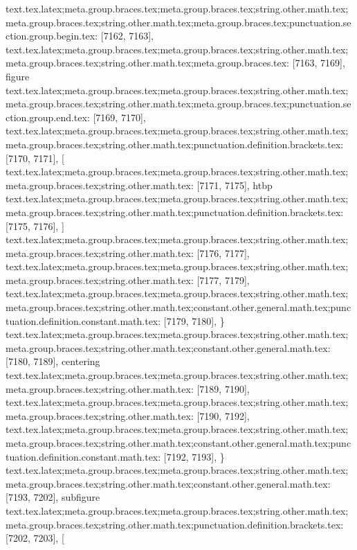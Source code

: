 {{{{{{{{{{{{{{{{{{{{{{{{{{{{{{{{{{{{{{{{{{{{{{{{{{{{{{{{{{{{{{{{{{{{{{{{{{{{{{{{{{{{{{{{{{{{{{{{{{{{{{{{{{{{{{{{{{{{{{{{{{{{{{{{{{{{{{{{{{{{{{{{{{{{{{{{{{{{{{{{{{{{{{{{{{{{{{{{{{{{{{{{{{{text.tex.latex;meta.group.braces.tex;meta.group.braces.tex;string.other.math.tex;meta.group.braces.tex;string.other.math.tex;meta.group.braces.tex;punctuation.section.group.begin.tex: [7162, 7163], {{}
text.tex.latex;meta.group.braces.tex;meta.group.braces.tex;string.other.math.tex;meta.group.braces.tex;string.other.math.tex;meta.group.braces.tex: [7163, 7169], {figure}
text.tex.latex;meta.group.braces.tex;meta.group.braces.tex;string.other.math.tex;meta.group.braces.tex;string.other.math.tex;meta.group.braces.tex;punctuation.section.group.end.tex: [7169, 7170], {}}
text.tex.latex;meta.group.braces.tex;meta.group.braces.tex;string.other.math.tex;meta.group.braces.tex;string.other.math.tex;punctuation.definition.brackets.tex: [7170, 7171], {[}
text.tex.latex;meta.group.braces.tex;meta.group.braces.tex;string.other.math.tex;meta.group.braces.tex;string.other.math.tex: [7171, 7175], {htbp}
text.tex.latex;meta.group.braces.tex;meta.group.braces.tex;string.other.math.tex;meta.group.braces.tex;string.other.math.tex;punctuation.definition.brackets.tex: [7175, 7176], {]}
text.tex.latex;meta.group.braces.tex;meta.group.braces.tex;string.other.math.tex;meta.group.braces.tex;string.other.math.tex: [7176, 7177], {
}
text.tex.latex;meta.group.braces.tex;meta.group.braces.tex;string.other.math.tex;meta.group.braces.tex;string.other.math.tex: [7177, 7179], {  }
text.tex.latex;meta.group.braces.tex;meta.group.braces.tex;string.other.math.tex;meta.group.braces.tex;string.other.math.tex;constant.other.general.math.tex;punctuation.definition.constant.math.tex: [7179, 7180], {\}
text.tex.latex;meta.group.braces.tex;meta.group.braces.tex;string.other.math.tex;meta.group.braces.tex;string.other.math.tex;constant.other.general.math.tex: [7180, 7189], {centering}
text.tex.latex;meta.group.braces.tex;meta.group.braces.tex;string.other.math.tex;meta.group.braces.tex;string.other.math.tex: [7189, 7190], {
}
text.tex.latex;meta.group.braces.tex;meta.group.braces.tex;string.other.math.tex;meta.group.braces.tex;string.other.math.tex: [7190, 7192], {  }
text.tex.latex;meta.group.braces.tex;meta.group.braces.tex;string.other.math.tex;meta.group.braces.tex;string.other.math.tex;constant.other.general.math.tex;punctuation.definition.constant.math.tex: [7192, 7193], {\}
text.tex.latex;meta.group.braces.tex;meta.group.braces.tex;string.other.math.tex;meta.group.braces.tex;string.other.math.tex;constant.other.general.math.tex: [7193, 7202], {subfigure}
text.tex.latex;meta.group.braces.tex;meta.group.braces.tex;string.other.math.tex;meta.group.braces.tex;string.other.math.tex;punctuation.definition.brackets.tex: [7202, 7203], {[}
}}}}}}}}}}}}}}}}}}}}}}}}}}}}}}}}}}}}}}}}}}}}}}}}}}}}}}}}}}}}}}}}}}}}}}}}}}}}}}}}}}}}}}}}}}}}}}}}}}}}}}}}}}}}}}}}}}}}}}}}}}}}}}}}}}}}}}}}}}}}}}}}}}}}}}}}}}}}}}}}}}}}}}}}}}}}}}}}}}}}}}}}}}}}}
